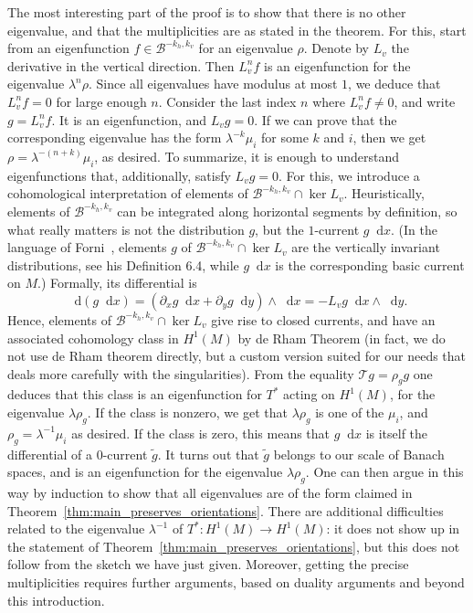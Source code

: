 \documentclass[11pt, a4paper, oneside, final, pagebackref]{amsart}
\newcommand{\boB}{\mathcal{B}}
\newcommand{\boT}{\mathcal{T}}
\newcommand{\dd}{\mathop{}\!\mathrm{d}}
\theoremstyle{definition}
\numberwithin{equation}{section}
\begin{document}
The most interesting part of the proof is to show that there is no other
eigenvalue, and that the multiplicities are as stated in the theorem. For
this, start from an eigenfunction $f \in \boB^{-k_h, k_v}$ for an eigenvalue
$\rho$. Denote by $L_v$ the derivative in the vertical direction. Then $L_v^n
f$ is an eigenfunction for the eigenvalue $\lambda^n \rho$. Since all
eigenvalues have modulus at most $1$, we deduce that $L_v^n f = 0$ for large
enough $n$. Consider the last index $n$ where $L_v^n f \neq 0$, and write $g
= L_v^n f$. It is an eigenfunction, and $L_v g = 0$. If we can prove that the
corresponding eigenvalue has the form $\lambda^{-k} \mu_i$ for some $k$ and
$i$, then we get $\rho = \lambda^{-(n+k)} \mu_i$, as desired. To summarize,
it is enough to understand eigenfunctions that, additionally, satisfy $L_v g
= 0$. For this, we introduce a cohomological interpretation of elements of
$\boB^{-k_h, k_v} \cap \ker L_v$. Heuristically, elements of $\boB^{-k_h,
k_v}$ can be integrated along horizontal segments by definition, so what
really matters is not the distribution $g$, but the $1$-current $g\dd x$. (In
the language of Forni~\cite{forni_deviation}, elements $g$ of $\boB^{-k_h,
k_v} \cap \ker L_v$ are the vertically invariant distributions, see his
Definition 6.4, while $g\dd x$ is the corresponding basic current on $M$.)
Formally, its differential is
\begin{equation*}
  \dd(g\dd x) =
  (\partial_x g \dd x + \partial_y g \dd y) \wedge \dd x
  = - L_v g \dd x \wedge \dd y.
\end{equation*}
Hence, elements of $\boB^{-k_h, k_v} \cap \ker L_v$ give rise to closed
currents, and have an associated cohomology class in $H^1(M)$ by de Rham
Theorem (in fact, we do not use de Rham theorem directly, but a custom
version suited for our needs that deals more carefully with the
singularities). From the equality $\boT g = \rho_g g$ one deduces that this
class is an eigenfunction for $T^*$ acting on $H^1(M)$, for the eigenvalue
$\lambda \rho_g$. If the class is nonzero, we get that $\lambda \rho_g$ is
one of the $\mu_i$, and $\rho_g = \lambda^{-1} \mu_i$ as desired. If the
class is zero, this means that $g \dd x$ is itself the differential of a
$0$-current $\tilde g$. It turns out that $\tilde g$ belongs to our scale of
Banach spaces, and is an eigenfunction for the eigenvalue $\lambda \rho_g$.
One can then argue in this way by induction to show that all eigenvalues are
of the form claimed in Theorem~\ref{thm:main_preserves_orientations}. There
are additional difficulties related to the eigenvalue $\lambda^{-1}$ of $T^*
: H^1(M)\to H^1(M)$: it does not show up in the statement of
Theorem~\ref{thm:main_preserves_orientations}, but this does not follow from
the sketch we have just given. Moreover, getting the precise multiplicities
requires further arguments, based on duality arguments and beyond this
introduction.
\end{document}
